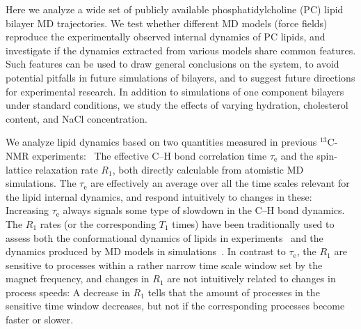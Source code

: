 \documentclass[journal=jpcbfk,manuscript=article,layout=twocolumn]{achemso}
\begin{document}
%
Here we analyze a wide set of publicly available phosphatidylcholine (PC) lipid bilayer MD trajectories. We test whether different MD models (force fields) reproduce the experimentally observed internal dynamics of PC lipids, and investigate if the dynamics extracted from various models share common features. Such features can be used to draw general conclusions on the system, to avoid potential pitfalls in future simulations of bilayers, and to suggest future directions for experimental research.  In addition to simulations of one component bilayers under standard conditions, we study the effects of varying hydration, cholesterol content, and NaCl concentration.

We analyze lipid dynamics based on two quantities measured in previous $^{13}$C-NMR experiments:~\cite{ferreira15,pham15,Volke:1995a}
The effective C--H bond correlation time $\tau_\mathrm{e}$ and
the spin-lattice relaxation rate $R_{1}$,
both %
directly calculable from atomistic MD simulations.
The
$\tau_\mathrm e$ are effectively an average over all the time scales relevant for the lipid internal dynamics,
and respond intuitively to changes in these: 
Increasing $\tau_\mathrm{e}$ always signals some type of slowdown in the C--H bond dynamics. %
\cite{ferreira15}
%
The $R_{1}$ rates (or the corresponding $T_{1}$ times) have been traditionally used to assess both the conformational dynamics of lipids in experiments~\cite{feller02,eldho03,wohlert06,klauda08,leftin11} and the dynamics produced by MD models in simulations~\cite{feller02,wohlert06,klauda08,klauda08II}.
In contrast to $\tau_\mathrm e$, the $R_1$ are sensitive to processes within a rather narrow time scale window set by the magnet frequency, and changes in $R_1$ are not intuitively related to changes in process speeds: A decrease in $R_1$ tells that the amount of processes in the sensitive time window decreases, but not if the corresponding processes become faster or slower.
\end{document}
